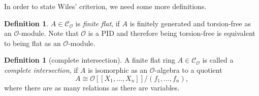 \documentclass{article}
\theoremstyle{plain}%
\theoremstyle{definition}
\newtheorem{definition}[theorem]{Definition}
\theoremstyle{remark}
\newcommand{\co}{\mathcal{C}_\mathcal{O}}
\begin{document}
In order to state Wiles' criterion, we need some more definitions.
\begin{definition}
    \(A \in \co\) is \textit{finite flat}, if \(A\) is finitely generated 
    and torsion-free as an \(\mathcal{O}\)-module.
    Note that \(\mathcal{O}\) is a PID and therefore being torsion-free 
    is equivalent to being flat as an \(\mathcal{O}\)-module.
\end{definition}

\begin{definition}[complete intersection]\cite[see][Def. 5.1]{Darmon1995}
    A finite flat ring \(A \in \co\) is called a \textit{complete intersection}, 
    if \(A\) is isomorphic as an \(\mathcal{O}\)-algebra to a quotient
    \[A \cong \mathcal{O}[[X_1, \dots, X_n]]/(f_1, \dots, f_n),\] 
    where there are as many relations as there are variables.
\end{definition}
\end{document}
